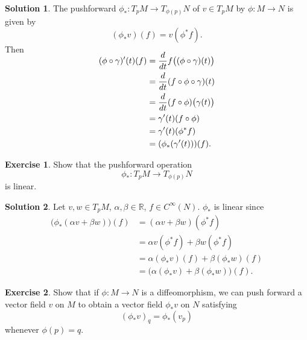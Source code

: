 \documentclass[11pt, a4paper]{report}
\theoremstyle{definition}
\newtheorem{exercise}{Exercise}[part]
\newtheorem{solution}{Solution}[part]
\newenvironment{ex}{\begin{exercise}}{\end{exercise}\pagebreak[1]}
\newenvironment{sol}{\begin{solution}}{\end{solution}\pagebreak[3]}
\newenvironment{nowidthtags}{\usetagform{nowidth}}{\ignorespacesafterend}
\begin{document}
\begin{sol}

The pushforward $\phi_*: T_p M \to T_{\phi(p)} N$ of $v \in T_p M$ by $\phi: M \to N$ is given by
\begin{nowidthtags}
\[
    (\phi_* v) (f) = v (\phi^* f). \tag{pushforward of a vector}\label{eq:pushforwardvector}
\]
\end{nowidthtags}
Then
\begin{align*}
    \SwapAboveDisplaySkip
    (\phi \circ \gamma)'(t)(f) &= \frac{d}{dt} f \bigl( (\phi \circ \gamma)(t) \bigr) \\
        &= \frac{d}{dt} (f \circ \phi \circ \gamma)(t) \\
        &= \frac{d}{dt} (f \circ \phi) \bigl( \gamma(t) \bigr) \\
        &= \gamma'(t)(f \circ \phi) \\
        &= \gamma'(t)(\phi^* f) \\
        &= (\phi_* (\gamma'(t)))(f).
\end{align*}

\end{sol}

\begin{ex}

Show that the pushforward operation
\[
    \phi_*: T_p M \to T_{\phi(p)} N
\]
is linear.

\end{ex}

\begin{sol}

Let $v, w \in T_p M$, $\alpha, \beta \in \mathbb{R}$, $f \in C^\infty(N)$. $\phi_*$ is linear since
\begin{align*}
    \bigl( \phi_*(\alpha v + \beta w) \bigr)(f) &= (\alpha v + \beta w) (\phi^* f) \\
        &= \alpha v (\phi^* f) + \beta w (\phi^* f) \\
        &= \alpha (\phi_* v)(f) + \beta (\phi_* w)(f) \\
        &= \bigl( \alpha (\phi_* v) + \beta (\phi_* w) \bigr)(f).
\end{align*}

\end{sol}

\begin{ex}

Show that if $\phi: M \to N$ is a diffeomorphism, we can push forward a vector field $v$ on $M$ to obtain a vector field $\phi_*v$ on $N$ satisfying
\[
    {(\phi_* v)}_q = \phi_*(v_p)
\]
whenever $\phi(p) = q$.

\end{ex}
\end{document}
